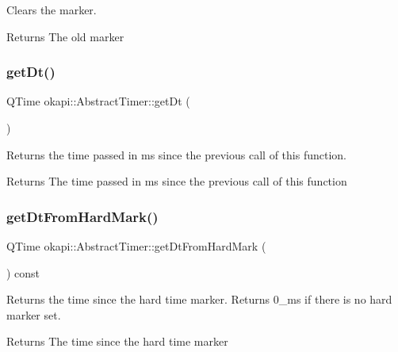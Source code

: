 Clears the marker.

\begin{DoxyReturn}{Returns}
The old marker 
\end{DoxyReturn}
\mbox{\label{classokapi_1_1AbstractTimer_a6c79c35780dbc4e04e356167bb175424}} 
\subsubsection{\texorpdfstring{getDt()}{getDt()}}
{\footnotesize\ttfamily Q\+Time okapi\+::\+Abstract\+Timer\+::get\+Dt (\begin{DoxyParamCaption}{ }\end{DoxyParamCaption})\hspace{0.3cm}{\ttfamily [virtual]}}

Returns the time passed in ms since the previous call of this function.

\begin{DoxyReturn}{Returns}
The time passed in ms since the previous call of this function 
\end{DoxyReturn}
\mbox{\label{classokapi_1_1AbstractTimer_ae32d95df73d640f248f987757163a164}} 
\subsubsection{\texorpdfstring{getDtFromHardMark()}{getDtFromHardMark()}}
{\footnotesize\ttfamily Q\+Time okapi\+::\+Abstract\+Timer\+::get\+Dt\+From\+Hard\+Mark (\begin{DoxyParamCaption}{ }\end{DoxyParamCaption}) const\hspace{0.3cm}{\ttfamily [virtual]}}

Returns the time since the hard time marker. Returns 0\+\_\+ms if there is no hard marker set.

\begin{DoxyReturn}{Returns}
The time since the hard time marker 
\end{DoxyReturn}
\mbox{\label{classokapi_1_1AbstractTimer_a11b84685aac3247ce5abdd11419e350e}} 

